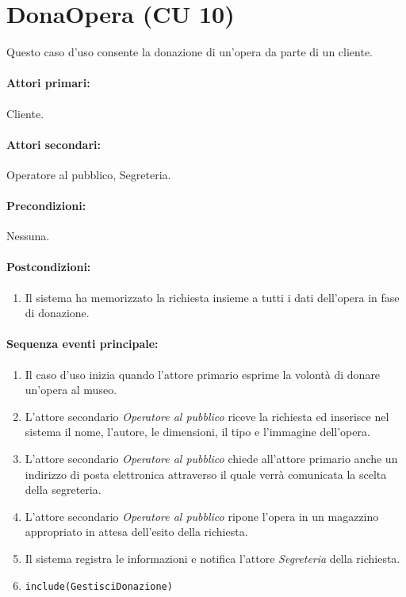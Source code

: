 \documentclass{article}
\begin{document}
\newpage 

		\section*{DonaOpera (CU 10)}
	
	\indent\indent Questo caso d'uso consente la donazione di un'opera da parte di un cliente.
	
	\paragraph{Attori primari:}Cliente.
	
	\paragraph{Attori secondari:}Operatore al pubblico, Segreteria.
	
	\paragraph{Precondizioni:}Nessuna.
	
	\paragraph{Postcondizioni:}
		\begin{enumerate}[itemsep=8pt,parsep=0pt]
				\item Il sistema ha memorizzato la richiesta insieme a tutti i dati dell'opera in fase di donazione.
		\end{enumerate}	
	
	\paragraph{Sequenza eventi principale:}

		\begin{enumerate}[itemsep=8pt,parsep=0pt]
		
				\item Il caso d'uso inizia quando l'attore primario esprime la volontà di donare un'opera al museo.
		
				\item L'attore secondario \emph{Operatore al pubblico} riceve la richiesta ed inserisce nel sistema il nome, l'autore, le dimensioni, il tipo e l'immagine dell'opera.

				\item L'attore secondario \emph{Operatore al pubblico} chiede all'attore primario anche un indirizzo di posta elettronica attraverso il quale verrà comunicata la scelta della segreteria.

				\item L'attore secondario \emph{Operatore al pubblico} ripone l'opera in un magazzino appropriato in attesa dell'esito della richiesta.

				\item Il sistema registra le informazioni e notifica l'attore \emph{Segreteria} della richiesta.

				\item \texttt{include(GestisciDonazione)}						
		
		\end{enumerate}	
\end{document}
